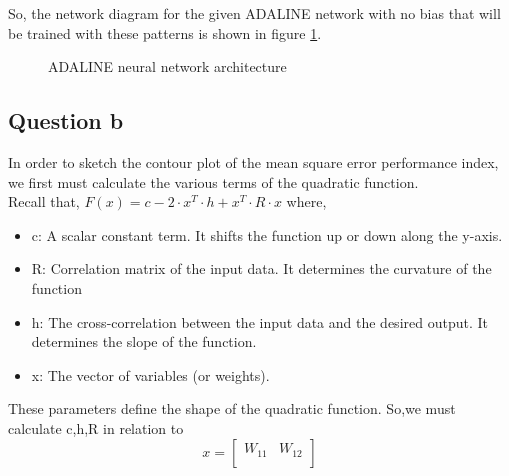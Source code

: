 So, the network diagram for the given ADALINE network with no bias that will be trained with  these patterns is shown in figure \ref{fig:prob8_adaline_draw}.

\begin{figure}[htpb]
	\centering
	
	\caption{ADALINE neural network architecture}
	\label{fig:prob8_adaline_draw}
\end{figure}

\subsection{Question b}
In order to sketch the contour plot of the mean square error performance index, we first must calculate the various terms of the quadratic function.\\
Recall that, $ F(x) = c-2 \cdot x^T \cdot h + x^T \cdot R \cdot x $ where,
\begin{itemize}
	\item c: A scalar constant term. It shifts the function up or down along the y-axis.
	\item R: Correlation matrix of the input data. It determines the curvature of the function
	\item h: The cross-correlation between the input data and the desired output.  It determines the slope of the function.
	\item x: The vector of variables (or weights).
\end{itemize}
These parameters define the shape of the quadratic function. So,we must calculate c,h,R in relation to 
 \[x = \left[
\begin{array}{cc}  
  	W_{11} & W_{12} \\  
\end{array}
\right]
\]

